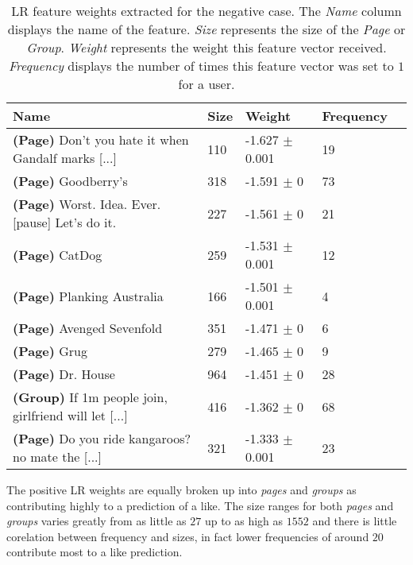 \begin{table}[h]
\begin{minipage}[b]{1.0\textwidth}
\centering
  \begin{tabular}{|l|l|l|l|l|} %
  \hline
  \textbf{Name} & \textbf{Size} & \textbf{Weight} & \textbf{Frequency} \\ \hline

\small{\textbf{(Page)} Don't you hate it when Gandalf marks [...] } & 110 & -1.627 $\pm$ 0.001 & 19 \\ \hline
\small{\textbf{(Page)} Goodberry's } & 318 & -1.591 $\pm$ 0 & 73 \\ \hline
\small{\textbf{(Page)} Worst. Idea. Ever. [pause] Let's do it. } & 227 & -1.561 $\pm$ 0 & 21 \\ \hline
\small{\textbf{(Page)} CatDog } & 259 & -1.531 $\pm$ 0.001 & 12 \\ \hline
\small{\textbf{(Page)} Planking Australia } & 166 & -1.501 $\pm$ 0.001 & 4 \\ \hline
\small{\textbf{(Page)} Avenged Sevenfold } & 351 & -1.471 $\pm$ 0 & 6 \\ \hline
\small{\textbf{(Page)} Grug } & 279 & -1.465 $\pm$ 0 & 9 \\ \hline
\small{\textbf{(Page)} Dr. House } & 964 & -1.451 $\pm$ 0 & 28 \\ \hline
\small{\textbf{(Group)} If 1m people join, girlfriend will let [...] } & 416 & -1.362 $\pm$ 0 & 68 \\ \hline
\small{\textbf{(Page)} Do you ride kangaroos? no mate the [...] } & 321 & -1.333 $\pm$ 0.001 & 23 \\ \hline
  \end{tabular}
  \caption{LR feature weights extracted for the negative case. The \emph{Name} column displays the name of the feature.
                        \emph{Size} represents the size of the \emph{Page} or \emph{Group}.
                        \emph{Weight} represents the weight this feature vector received.  
                        \emph{Frequency} displays the number of times this feature vector was set to $1$ for a user.}
\end{minipage}
\end{table}

The positive LR weights are equally broken up into \emph{pages} and \emph{groups} as contributing highly to a prediction of a like. The size ranges 
for both \emph{pages} and \emph{groups} varies greatly from as little as $27$ up to as high as $1552$ and there is little corelation between 
frequency and sizes, in fact lower frequencies of around $20$ contribute most to a like prediction.

